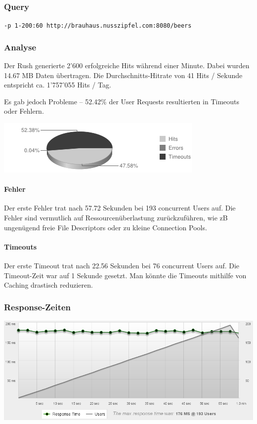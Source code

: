 \documentclass[10pt,a4paper]{scrartcl}
\begin{document}
\subsubsection*{Query}

\texttt{-p 1-200:60 http://brauhaus.nusszipfel.com:8080/beers}

\subsubsection*{Analyse}

Der Rush generierte 2'600 erfolgreiche Hits während einer Minute. Dabei wurden 14.67 MB Daten übertragen.
Die Durchschnitts-Hitrate von 41 Hits / Sekunde entspricht ca. 1'757'055 Hits / Tag.

Es gab jedoch Probleme -- 52.42\% der User Requests resultierten in Timeouts oder Fehlern.

\includegraphics[scale=1]{loadtests/chart-200.png} 

\paragraph*{Fehler}

Der erste Fehler trat nach 57.72 Sekunden bei 193 concurrent Users auf. Die Fehler sind vermutlich
auf Ressourcenüberlastung zurückzuführen, wie zB ungenügend freie File Descriptors oder zu kleine
Connection Pools.

\paragraph*{Timeouts}

Der erste Timeout trat nach 22.56 Sekunden bei 76 concurrent Users auf. Die Timeout-Zeit war auf 1
Sekunde gesetzt. Man könnte die Timeouts mithilfe von Caching drastisch reduzieren.

\subsubsection*{Response-Zeiten}

\includegraphics[width=\textwidth]{loadtests/responsetimes-200.png} 
\end{document}
